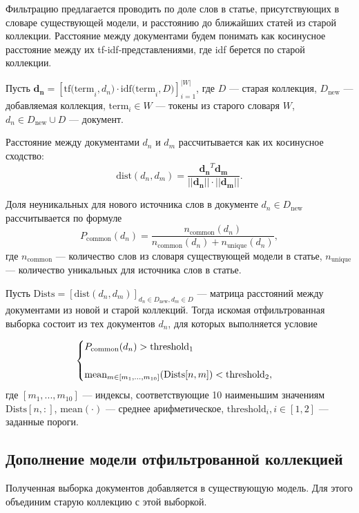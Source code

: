 Фильтрацию предлагается проводить по доле слов в статье, присутствующих в словаре существующей модели, и расстоянию до ближайших статей из старой коллекции. Расстояние между документами будем понимать как косинусное расстояние между их tf-idf-представлениями, где idf берется по старой коллекции.

Пусть $\boldsymbol{d_n }= [ \text{tf(term}_i, d_n) \cdot \text{idf(term}_i, D) ]_{i=1}^{|W|}$, где $D$ --- старая коллекция, $D_{\text{new}}$ --- добавляемая коллекция, $\text{term}_i \in W$ --- токены из старого словаря $W$, $d_n \in D_{\text{new}} \cup D$ --- документ.

Расстояние между документами $d_n$ и $d_m$ рассчитывается как их косинусное сходство:
$$\text{dist}(d_n, d_m) = \dfrac{\boldsymbol{d_n }^T \boldsymbol{d_m }}{||\boldsymbol{d_n }|| \cdot ||\boldsymbol{d_m }||}.$$

Доля неуникальных для нового источника слов в документе $d_n \in D_{\text{new}}$ рассчитывается по формуле
$$P_{\text{common}}(d_n) = \dfrac{n_{\text{common}}(d_n)}{n_{\text{common}}(d_n)+n_{\text{unique}}(d_n)},$$ где $n_{\text{common}}$ --- количество слов из словаря существующей модели в статье, $n_{\text{unique}}$ --- количество уникальных для источника слов в статье.

Пусть $\text{Dists} = [ \text{dist}(d_n, d_m)]_{d_n \in D_{\text{new}}, d_m \in D }$ --- матрица расстояний между документами из новой и старой коллекций. Тогда искомая отфильтрованная выборка состоит из тех документов $d_n$, для которых выполняется условие

\begin{equation}
 \begin{cases}
   P_{\text{common}}(d_n) > \text{threshold}_1 \\
   \\
   \text{mean}_{m \in [m_1, ..., m_{10}]}(\text{Dists}[n,m])< \text{threshold}_2,
   \end{cases} \notag
\end{equation}
где $[m_1, ..., m_{10}]$ --- индексы, соответствующие 10 наименьшим значениям $\text{Dists}[n,:]$, $\text{mean}(\cdot)$ --- среднее арифметическое,   $\text{threshold}_i, i \in [1,2]$ --- заданные пороги.

\subsection{Дополнение модели отфильтрованной коллекцией}
Полученная выборка документов добавляется в существующую модель.
Для этого объединим старую коллекцию с этой выборкой.

